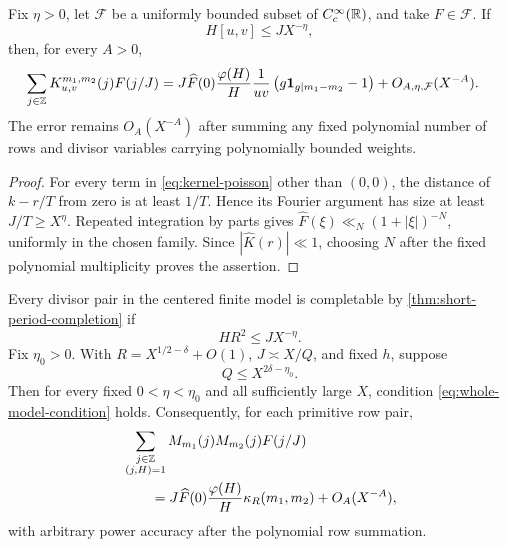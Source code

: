 \begin{theorem}
\label{thm:short-period-completion}
Fix \(\eta>0\), let \(\mathcal F\) be a uniformly bounded subset of
\(C_c^\infty(\mathbb R)\), and take \(F\in\mathcal F\).  If
\begin{equation}
 H[u,v]\le JX^{-\eta},
 \label{eq:short-period}
\end{equation}
then, for every \(A>0\),
\begin{align}
 \sum_{j\in\mathbb Z}K_{u,v}^{m_1,m_2}(j)F(j/J)
 ={}&J\widehat F(0)\frac{\varphi(H)}H\frac1{uv}
 \left(g\mathbf 1_{g\mid m_1-m_2}-1\right)
 +O_{A,\eta,\mathcal F}(X^{-A}).
 \label{eq:short-period-completed}
\end{align}
The error remains \(O_A(X^{-A})\) after summing any fixed polynomial
number of rows and divisor variables carrying polynomially bounded
weights.
\end{theorem}

\begin{proof}
For every term in \eqref{eq:kernel-poisson} other than \((0,0)\),
the distance of \(k-r/T\) from zero is at least \(1/T\).  Hence its
Fourier argument has size at least \(J/T\ge X^\eta\).  Repeated
integration by parts gives
\(\widehat F(\xi)\ll_N(1+|\xi|)^{-N}\), uniformly in the chosen
family.  Since \(|\widehat K(r)|\ll1\), choosing \(N\) after the
fixed polynomial multiplicity proves the assertion.
\end{proof}

\begin{corollary}
\label{cor:whole-model-completion}
Every divisor pair in the centered finite model is completable by
\cref{thm:short-period-completion} if
\begin{equation}
 HR^2\le JX^{-\eta}.
 \label{eq:whole-model-condition}
\end{equation}
Fix \(\eta_0>0\).  With \(R=X^{1/2-\delta}+O(1)\),
\(J\asymp X/Q\), and fixed \(h\), suppose
\begin{equation}
 Q\le X^{2\delta-\eta_0}.
 \label{eq:whole-model-exponent}
\end{equation}
Then for every fixed \(0<\eta<\eta_0\) and all sufficiently large
\(X\), condition \eqref{eq:whole-model-condition} holds.  Consequently,
for each primitive row pair,
\begin{align}
 &\sum_{\substack{j\in\mathbb Z\\(j,H)=1}}
 M_{m_1}(j)M_{m_2}(j)F(j/J)
 \notag\\
 &\qquad={}
 J\widehat F(0)\frac{\varphi(H)}H
 \kappa_R(m_1,m_2)+O_A(X^{-A}),
 \label{eq:whole-model-completed}
\end{align}
with arbitrary power accuracy after the polynomial row summation.
\end{corollary}

